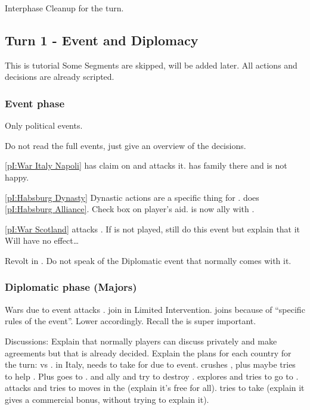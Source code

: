 \aparag Interphase
\bparag Cleanup for the turn.

\subsection{Turn 1 - Event and Diplomacy}
\aparag This is tutorial
\bparag Some Segments are skipped, will be added later.
\bparag All actions and decisions are already scripted.

\subsubsection{Event phase}
\aparag Only political events.

\aparag Do not read the full events, just give an overview of the decisions.

\aparag \ref{pI:War Italy Napoli}
\bparag \FRA has claim on  and attacks it. \HIS has family there
and is not happy.

\aparag \ref{pI:Habsburg Dynasty}
\bparag Dynastic actions are a specific thing for \HIS.
\bparag \HIS does \ref{pI:Habsburg Alliance}. Check box on player's aid.
\bparag \HIS is now ally with \paysHabsbourg.

\aparag \ref{pI:War Scotland}
\bparag \paysEcosse attacks \ANG.
\bparag If \ANG is not played, still do this event but explain that it Will
have no effect\ldots

\aparag Revolt
\bparag \REVOLT\facemoins in \provinceCatalogne.
\bparag Do not speak of the Diplomatic event that normally comes with it.

\subsubsection{Diplomatic phase (Majors)}
\aparag Wars due to event
\bparag \FRA attacks \paysNaples. \HIS join in Limited
Intervention. \paysSavoie joins \FRA because of ``specific rules of the
event''.
\bparag Lower \STAB accordingly. Recall the \STAB is super important.

\aparag Discussions: Explain that normally players can discuss privately and
make agreements but that is already decided. Explain the plans for each
country for the turn:
\bparag \ANG vs \paysEcosse.
\bparag \FRA in Italy, needs to take \villeNaples for \VPs due to event.
\bparag \HIS crushes \REVOLT, plus maybe tries to help \paysNaples. Plus goes
to \continentAmerica.
\bparag \POL and \RUS ally and try to destroy \paysDon.
\bparag \POR explores and tries to go to \continentIndia.
\bparag \TUR attacks \paysGeorgie and tries to moves in the \regionBalkans
(explain it's free for all).
\bparag \VEN tries to take \villeRagusa (explain it gives a commercial bonus,
without trying to explain it).

